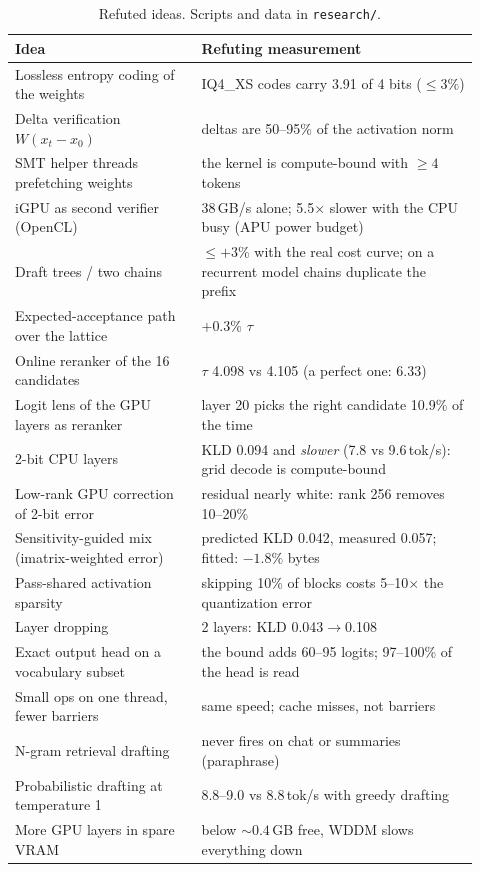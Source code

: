 \documentclass[10pt]{article}
\newcommand{\tps}{tok/s}
\begin{document}
\begin{table}[t]
\centering\small
\begin{tabular}{p{0.37\linewidth}p{0.55\linewidth}}
\toprule
Idea & Refuting measurement \\
\midrule
Lossless entropy coding of the weights & IQ4\_XS codes carry 3.91 of 4 bits ($\le3\%$) \\
Delta verification $W(x_t-x_0)$ & deltas are 50--95\% of the activation norm \\
SMT helper threads prefetching weights & the kernel is compute-bound with $\ge4$ tokens \\
iGPU as second verifier (OpenCL) & 38\,GB/s alone; 5.5$\times$ slower with the CPU busy (APU power budget) \\
Draft trees / two chains & $\le+3\%$ with the real cost curve; on a recurrent model chains duplicate the prefix \\
Expected-acceptance path over the lattice & $+0.3\%$ $\tau$ \\
Online reranker of the 16 candidates & $\tau$ 4.098 vs 4.105 (a perfect one: 6.33) \\
Logit lens of the GPU layers as reranker & layer 20 picks the right candidate 10.9\% of the time \\
2-bit CPU layers & KLD 0.094 and \emph{slower} (7.8 vs 9.6\,\tps): grid decode is compute-bound \\
Low-rank GPU correction of 2-bit error & residual nearly white: rank 256 removes 10--20\% \\
Sensitivity-guided mix (imatrix-weighted error) & predicted KLD 0.042, measured 0.057; fitted: $-1.8\%$ bytes \\
Pass-shared activation sparsity & skipping 10\% of blocks costs 5--10$\times$ the quantization error \\
Layer dropping & 2 layers: KLD 0.043$\to$0.108 \\
Exact output head on a vocabulary subset & the bound adds 60--95 logits; 97--100\% of the head is read \\
Small ops on one thread, fewer barriers & same speed; cache misses, not barriers \\
N-gram retrieval drafting & never fires on chat or summaries (paraphrase) \\
Probabilistic drafting at temperature 1 & 8.8--9.0 vs 8.8\,\tps{} with greedy drafting \\
More GPU layers in spare VRAM & below ${\sim}0.4$\,GB free, WDDM slows everything down \\
\bottomrule
\end{tabular}
\caption{Refuted ideas. Scripts and data in \texttt{research/}.}
\label{tab:negative}
\end{table}
\end{document}
